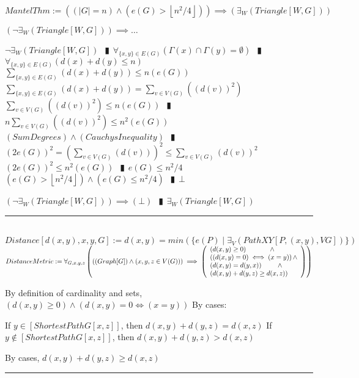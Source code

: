 \documentclass{book}
\newcommand{\abr}{:=}
\newcommand{\pipe}{$\phantom{(}\vrectangleblack\phantom{)}$}
\newcommand{\pr}[1]{\left(#1\right)}
\newcommand{\st}{\mathbin{|}}
\newcommand{\utup}[1]{\{#1\}}
\newcommand{\floor}[1]{\left\lfloor #1 \right\rfloor}
\begin{document}
$MantelThm \abr \pr{(|G| = n) \land \pr{e(G) > \floor{n^2 / 4}}} \implies \pr{\exists_{W}(Triangle[W, G])}$
\begin{enumerate}
  \lit $\pr{\lnot \exists_{W}(Triangle[W, G])} \implies \ldots$
  \begin{enumerate}
    \lit $\lnot \exists_{W}(Triangle[W, G])$ \pipe $\forall_{\utup{x, y} \in E(G)}\pr{\Gamma(x) \cap \Gamma(y) = \emptyset}$ \pipe $\forall_{\utup{x, y} \in E(G)}\pr{d(x) + d(y) \leq n}$
    \lit $\sum \limits_{\utup{x, y} \in E(G)}^{ }\pr{d(x) + d(y)} \leq n \pr{e(G)}$
    \lit $\sum \limits_{\utup{x, y} \in E(G)}^{ }\pr{d(x) + d(y)} = \sum \limits_{v \in V(G)}^{ }\pr{\pr{d(v)}^2}$
    \lit $\sum \limits_{v \in V(G)}^{ }\pr{\pr{d(v)}^2} \leq n \pr{e(G)}$ \pipe $n \sum \limits_{v \in V(G)}^{ }\pr{\pr{d(v)}^2} \leq n^2 \pr{e(G)}$
    \lit $(SumDegrees) \land (CauchysInequality)$ \pipe $\pr{2 e(G)}^2 = \pr{\sum \limits_{v \in V(G)}\pr{d(v)}}^2 \leq \sum \limits_{v \in V(G)}\pr{d(v)}^2$ %
    \lit $\pr{2 e(G)}^2 \leq n^2 \pr{e(G)}$ \pipe $e(G) \leq n^2 /4$
    \lit $\pr{e(G) > \floor{n^2 / 4}} \land \pr{e(G) \leq n^2 /4}$ \pipe $\bot$
  \end{enumerate}
  \lit $\pr{\lnot \exists_{W}(Triangle[W, G])} \implies (\bot)$ \pipe $\exists_{W}(Triangle[W, G])$
\end{enumerate} \vspace{.75mm} \hrule \vspace{.75mm} \ \\ 

$Distance[d(x, y), x, y, G] \abr d(x, y) = min\pr{\{e(P) \st \exists_{V}\pr{PathXY[P, (x, y), V G]}\}}$ \\
$DistanceMetric \abr \forall_{G, x, y, z}\pr{\pr{(Graph[G]) \land \pr{x, y, z \in V(G)}} \implies 
\left(\begin{array}{ll}
  \pr{d(x, y) \geq 0} \hfill \land \hfill \\
  \pr{\pr{d(x, y) = 0} \iff (x = y)} \hfill \land \hfill \\
  \pr{d(x, y) = d(y, x)} \hfill \land \hfill \\
  \pr{d(x, y) + d(y, z) \geq d(x, z)} \\
\end{array}\right)}$ \\
\begin{enumerate}
  \lit By definition of cardinality and sets, $\pr{d(x, y) \geq 0} \land \pr{d(x, y) = 0 \iff (x = y)}$
  \lit By cases:
  \begin{enumerate}
    \lit If $y \in [ShortestPathG[x, z]]$, then $d(x, y) + d(y, z) = d(x, z)$
    \lit If $y \notin [ShortestPathG[x, z]]$, then $d(x, y) + d(y, z) > d(x, z)$
  \end{enumerate}
  \lit By cases, $d(x, y) + d(y, z) \geq d(x, z)$
\end{enumerate} \vspace{.75mm} \hrule \vspace{.75mm} \ \\
\end{document}
